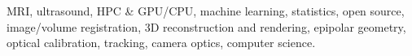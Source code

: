 




MRI, ultrasound, HPC \& GPU/CPU, machine learning, statistics, open source, image/volume registration, 3D reconstruction and rendering, epipolar geometry, optical calibration, tracking, camera optics, computer science.


